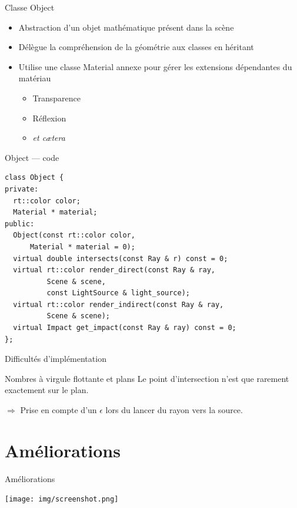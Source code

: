 \documentclass{beamer}
\begin{document}
\begin{frame}{Classe Object}
    \begin{itemize}
        \item Abstraction d'un objet mathématique présent dans la scène
        \item Délègue la compréhension de la géométrie aux classes en héritant
        \item Utilise une classe Material annexe pour gérer les extensions dépendantes du matériau
            \begin{itemize}
                \item Transparence
                \item Réflexion
                \item \emph{et cætera}
            \end{itemize}
    \end{itemize}
\end{frame}

\begin{frame}[fragile]{Object — code}
    \begin{lstlisting}
class Object {
private:
  rt::color color;
  Material * material;
public:
  Object(const rt::color color,
      Material * material = 0);
  virtual double intersects(const Ray & r) const = 0;
  virtual rt::color render_direct(const Ray & ray,
          Scene & scene,
          const LightSource & light_source);
  virtual rt::color render_indirect(const Ray & ray,
          Scene & scene);
  virtual Impact get_impact(const Ray & ray) const = 0;
};
\end{lstlisting}
\end{frame}

\begin{frame}{Difficultés d'implémentation}
\begin{block}{Nombres à virgule flottante et plans}
    Le point d'intersection n'est que rarement exactement sur le plan.

    $\Rightarrow$ Prise en compte d'un $\epsilon$ lors du lancer du rayon vers la source.
\end{block}
\end{frame}

\section{Améliorations}


\begin{frame}{Améliorations}


\begin{center}
  \texttt{[image: img/screenshot.png]}
\end{center}
\end{frame}
\end{document}
